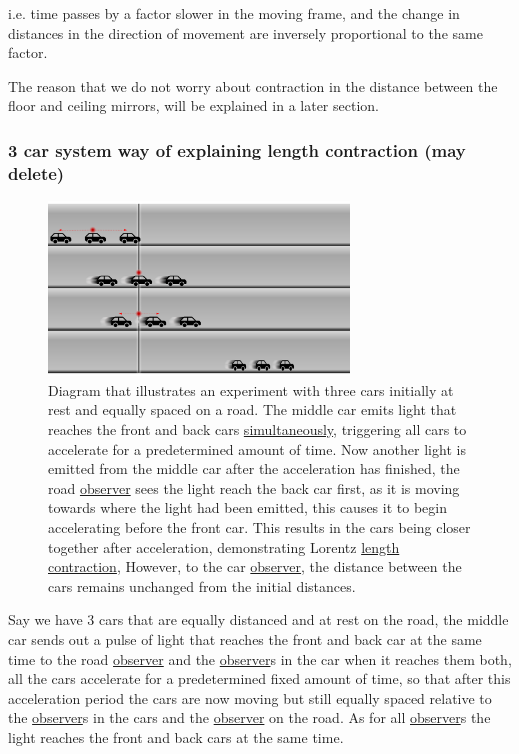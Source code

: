 i.e. time passes by a factor slower in the moving frame, and the change in distances in the direction of movement are inversely proportional to the same factor.

The reason that we do not worry about contraction in the distance between the floor and ceiling mirrors, will be explained in a later section.


\subsubsection{3 car system way of explaining length contraction (may delete)}

\begin{figure}[ht]
	\centering
	\includegraphics[width=8cm]{images/pdf/cars.pdf}
	\caption{Diagram that illustrates an experiment with three cars initially at rest and equally spaced on a road. The middle car emits light that reaches the front and back cars \protect\hyperlink{def-simultaneity}{simultaneously}, triggering all cars to accelerate for a predetermined amount of time. Now another light is emitted from the middle car after the acceleration has finished, the road \protect\hyperlink{def-observer}{observer} sees the light reach the back car first, as it is moving towards where the light had been emitted, this causes it to begin accelerating before the front car. This results in the cars being closer together after acceleration, demonstrating Lorentz \protect\hyperlink{def-length-contraction}{length contraction}, However, to the car \protect\hyperlink{def-observer}{observer}, the distance between the cars remains unchanged from the initial distances.}
	\label{fig: cars}
\end{figure}

Say we have 3 cars that are equally distanced and at rest on the road, the middle car sends out a pulse of light that reaches the front and back car at the same time to the road \hyperlink{def-observer}{observer} and the \hyperlink{def-observer}{observer}s in the car when it reaches them both, all the cars accelerate for a predetermined fixed amount of time, so that after this acceleration period the cars are now moving but still equally spaced relative to the \hyperlink{def-observer}{observer}s in the cars and the \hyperlink{def-observer}{observer} on the road. As for all \hyperlink{def-observer}{observer}s the light reaches the front and back cars at the same time.

